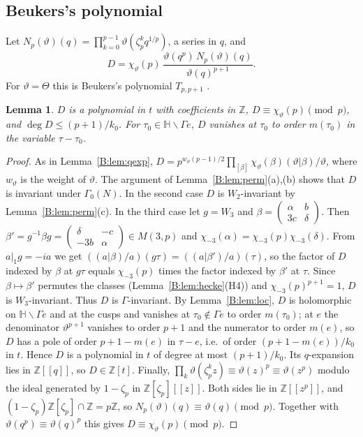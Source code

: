 \documentclass[11pt,a4paper]{article}
\newtheorem{lemma}[theorem]{Lemma}
\theoremstyle{definition}\newtheorem{definition}[theorem]{Definition}
\theoremstyle{remark}\newtheorem{remark}[theorem]{Remark}
\newcommand{\Z}{\mathbb Z}
\newcommand{\Hb}{\mathbb H}
\newcommand{\bmat}[4]{\left(\begin{smallmatrix}#1&#2\\#3&#4\end{smallmatrix}\right)}
\numberwithin{equation}{section}
\begin{document}
\subsection{Beukers's polynomial}
Let $N_p(\vartheta)(q)=\prod_{k=0}^{p-1}\vartheta(\zeta_p^kq^{1/p})$, a series in $q$, and
\[
D=\chi_\vartheta(p)\,\frac{\vartheta(q^p)\,N_p(\vartheta)(q)}{\vartheta(q)^{p+1}} .
\]
For $\vartheta=\Theta$ this is Beukers's polynomial $T_{p,p+1}$ \cite[\S\S4,5]{Beu26}.

\begin{lemma}\label{B:lem:D}
$D$ is a polynomial in $t$ with coefficients in $\Z$, $D\equiv\chi_\vartheta(p)\pmod p$, and $\deg D\le(p+1)/k_0$.
For $\tau_0\in\Hb\smallsetminus\Gamma e$, $D$ vanishes at $\tau_0$ to order $m(\tau_0)$ in the variable $\tau-\tau_0$.
\end{lemma}

\begin{proof}
As in Lemma~\ref{B:lem:qexp}, $D=p^{w_\vartheta(p-1)/2}\prod_{[\beta]}\chi_\vartheta(\beta)(\vartheta|\beta)/\vartheta$,
where $w_\vartheta$ is the weight of $\vartheta$. The argument of Lemma~\ref{B:lem:perm}(a),(b) shows that $D$ is invariant
under $\Gamma_0(N)$. In the second case $D$ is $W_2$-invariant by Lemma~\ref{B:lem:perm}(c). In the third case let
$g=W_3$ and $\beta=\bmat\alpha b{3c}\delta$. Then $\beta'=g^{-1}\beta g=\bmat\delta{-c}{-3b}\alpha\in M(3,p)$ and
$\chi_{-3}(\alpha)=\chi_{-3}(p)\chi_{-3}(\delta)$. From $a|_1g=-ia$ we get
$((a|\beta)/a)(g\tau)=((a|\beta')/a)(\tau)$, so the factor of $D$ indexed by $\beta$ at $g\tau$ equals
$\chi_{-3}(p)$ times the factor indexed by $\beta'$ at $\tau$. Since $\beta\mapsto\beta'$ permutes the classes
(Lemma~\ref{B:lem:hecke}(H4)) and $\chi_{-3}(p)^{p+1}=1$, $D$ is $W_3$-invariant. Thus $D$ is $\Gamma$-invariant. By
Lemma~\ref{B:lem:loc}, $D$ is holomorphic on $\Hb\smallsetminus\Gamma e$ and at the cusps and vanishes at
$\tau_0\notin\Gamma e$ to order $m(\tau_0)$; at $e$ the denominator $\vartheta^{p+1}$ vanishes to order $p+1$ and the
numerator to order $m(e)$, so $D$ has a pole of order $p+1-m(e)$ in $\tau-e$, i.e.\ of order $(p+1-m(e))/k_0$ in $t$.
Hence $D$ is a polynomial in $t$ of degree at most $(p+1)/k_0$. Its $q$-expansion lies in $\Z[[q]]$, so $D\in\Z[t]$.
Finally, $\prod_k\vartheta(\zeta_p^kz)\equiv\vartheta(z)^p\equiv\vartheta(z^p)$ modulo the ideal generated by
$1-\zeta_p$ in $\Z[\zeta_p][[z]]$. Both sides lie in $\Z[[z^p]]$, and $(1-\zeta_p)\Z[\zeta_p]\cap\Z=p\Z$, so
$N_p(\vartheta)(q)\equiv\vartheta(q)\pmod p$. Together with $\vartheta(q^p)\equiv\vartheta(q)^p$ this gives
$D\equiv\chi_\vartheta(p)\pmod p$.
\end{proof}
\end{document}
